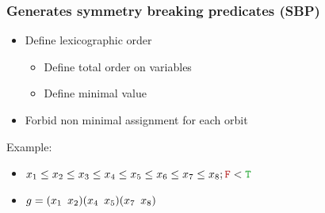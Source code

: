 \documentclass{beamer}
\newcommand{\cmark}{\ding{51}}%
\newcommand{\xmark}{\ding{55}}%
\begin{document}
\begin{frame}[noframenumbering]
\frametitle{Generates symmetry breaking predicates (SBP)}
\begin{itemize}
	\item Define lexicographic order
	\begin{itemize}
		\item Define total order on variables
		\item Define minimal value
	\end{itemize}
	\item Forbid non minimal assignment for each orbit %
\end{itemize}

\vfill
Example:\\
\begin{itemize}
	\item[]	$x_1 \leq x_2 \leq x_3  \leq x_4 \leq x_5 \leq x_6 \leq x_7 \leq x_8 ;  \false < \true$
	\item[] 	$g = (x_1 \enskip x_2)(x_4 \enskip x_5)(x_7 \enskip x_8) $\\
\end{itemize}

\vfill


\begin{center}
	

\end{center}
\end{frame}
\end{document}
